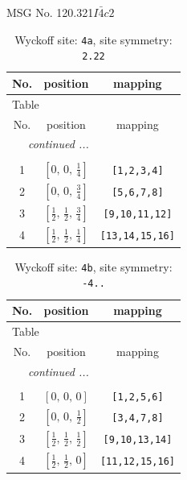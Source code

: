 \documentclass[fleqn,8pt]{jsarticle}
\begin{document}
\setcounter{MaxMatrixCols}{32}

\renewcommand{\tablename}{Table~}
\renewcommand{\figurename}{Figure~}
\begin{center}
\LARGE
MSG No. 120.321\quad$I\bar{4}c2$
\end{center}
\renewcommand{\arraystretch}{1.2}
\begin{longtable}{ccc}
\caption{Wyckoff site: {\tt 4a}, site symmetry: {\tt 2.22}}
 \\
 \hline \hline
No. & position & mapping \\ \hline \endfirsthead

\multicolumn{2}{l}{\tablename\ \thetable{}} \\
 \hline \hline
No. & position & mapping \\ \hline \endhead

 \hline \hline
\multicolumn{2}{r}{\footnotesize\it continued ...} \\ \endfoot

 \hline \hline
\multicolumn{2}{r}{} \\ \endlastfoot

1 & $\left[ 0,\, 0,\, \frac{1}{4} \right]$ & {\tt [1,2,3,4]} \\ \hline
2 & $\left[ 0,\, 0,\, \frac{3}{4} \right]$ & {\tt [5,6,7,8]} \\ \hline
3 & $\left[ \frac{1}{2},\, \frac{1}{2},\, \frac{3}{4} \right]$ & {\tt [9,10,11,12]} \\ \hline
4 & $\left[ \frac{1}{2},\, \frac{1}{2},\, \frac{1}{4} \right]$ & {\tt [13,14,15,16]} \\
\end{longtable}
\renewcommand{\arraystretch}{1.2}
\begin{longtable}{ccc}
\caption{Wyckoff site: {\tt 4b}, site symmetry: {\tt -4..}}
 \\
 \hline \hline
No. & position & mapping \\ \hline \endfirsthead

\multicolumn{2}{l}{\tablename\ \thetable{}} \\
 \hline \hline
No. & position & mapping \\ \hline \endhead

 \hline \hline
\multicolumn{2}{r}{\footnotesize\it continued ...} \\ \endfoot

 \hline \hline
\multicolumn{2}{r}{} \\ \endlastfoot

1 & $\left[ 0,\, 0,\, 0 \right]$ & {\tt [1,2,5,6]} \\ \hline
2 & $\left[ 0,\, 0,\, \frac{1}{2} \right]$ & {\tt [3,4,7,8]} \\ \hline
3 & $\left[ \frac{1}{2},\, \frac{1}{2},\, \frac{1}{2} \right]$ & {\tt [9,10,13,14]} \\ \hline
4 & $\left[ \frac{1}{2},\, \frac{1}{2},\, 0 \right]$ & {\tt [11,12,15,16]} \\
\end{longtable}
\end{document}
